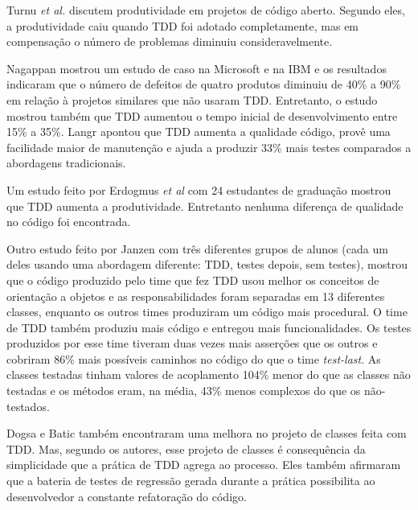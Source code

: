 Turnu \textit{et al.} \cite{turnu-tdd-opensouce} discutem produtividade em
projetos de código aberto. Segundo eles, a produtividade caiu quando TDD foi
adotado completamente, mas em compensação o número de problemas diminuiu 
consideravelmente.

Nagappan \cite{nagappan-ms} mostrou um estudo de caso na Microsoft e na IBM e os
resultados indicaram que o número de defeitos de quatro produtos diminuiu de 
40\% a 90\% em relação à projetos similares que não usaram TDD. Entretanto, o 
estudo mostrou também que TDD aumentou o tempo inicial de desenvolvimento entre 15\%
a 35\%. Langr \cite{langr} apontou que TDD aumenta a qualidade código, provê uma 
facilidade maior de manutenção e ajuda a produzir 33\% mais testes comparados  a
abordagens tradicionais.

Um estudo feito por Erdogmus \textit{et al} \cite{erdogmus-morisio} com 24 estudantes de
graduação mostrou que TDD aumenta a produtividade. Entretanto nenhuma diferença 
de qualidade no código foi encontrada.

Outro estudo feito por Janzen \cite{janzen-saiedian} com três diferentes grupos
de alunos (cada um deles usando uma abordagem diferente: TDD, testes depois, sem
testes), mostrou que o código produzido pelo time que fez TDD usou melhor os
conceitos de orientação a objetos e as responsabilidades foram separadas em 13 
diferentes classes, enquanto os outros times produziram um código mais
procedural. O time de TDD também produziu mais código e entregou mais
funcionalidades. Os testes produzidos por esse time tiveram duas vezes mais
asserções que os outros e cobriram 86\% mais possíveis caminhos no código 
do que o time \textit{test-last}. 
As classes testadas tinham valores de acoplamento 104\% menor do 
que as classes não testadas e os métodos eram, na média, 43\% menos complexos 
do que os não-testados.

Dogsa e Batic \cite{dogsa-batic} também encontraram uma melhora no
projeto de classes feita com TDD. Mas, segundo os autores, esse projeto de classes é 
consequência da simplicidade que a prática de TDD agrega ao processo. Eles
também  afirmaram que a bateria de testes de regressão gerada durante a prática 
possibilita ao desenvolvedor a constante refatoração do código.

